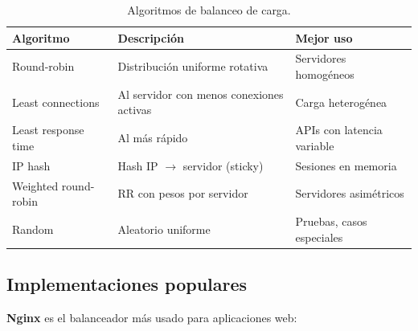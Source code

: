 \begin{table}[htbp]
\centering
\caption{Algoritmos de balanceo de carga.}
\footnotesize
\begin{tabularx}{\textwidth}{lXX}
\toprule
\textbf{Algoritmo} & \textbf{Descripción} & \textbf{Mejor uso}\\
\midrule
Round-robin & Distribución uniforme rotativa & Servidores homogéneos\\
Least connections & Al servidor con menos conexiones activas & Carga heterogénea\\
Least response time & Al más rápido & APIs con latencia variable\\
IP hash & Hash IP $\to$ servidor (sticky) & Sesiones en memoria\\
Weighted round-robin & RR con pesos por servidor & Servidores asimétricos\\
Random & Aleatorio uniforme & Pruebas, casos especiales\\
\bottomrule
\end{tabularx}
\end{table}

\subsection{Implementaciones populares}

\textbf{Nginx} es el balanceador más usado para aplicaciones web:


